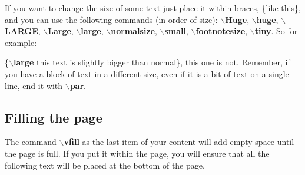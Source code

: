 \documentclass{report}
\begin{document}
            If you want to change the size of some text just place it within braces, \{like this\}, and you can use the following commands (in order of size): \textbf{$\backslash$Huge}, \textbf{$\backslash$huge}, \textbf{$\backslash$LARGE}, \textbf{$\backslash$Large}, \textbf{$\backslash$large}, \textbf{$\backslash$normalsize}, \textbf{$\backslash$small}, \textbf{$\backslash$footnotesize}, \textbf{$\backslash$tiny}. So for example:

            \{\textbf{$\backslash$large} this text is slightly bigger than normal\}, this one is not.
            Remember, if you have a block of text in a different size, even if it is a bit of text on a single line, end it with \textbf{$\backslash$par}.

        \subsection{Filling the page}

            The command \textbf{$\backslash$vfill} as the last item of your content will add empty space until the page is full. If you put it within the page, you will ensure that all the following text will be placed at the bottom of the page.
\end{document}
